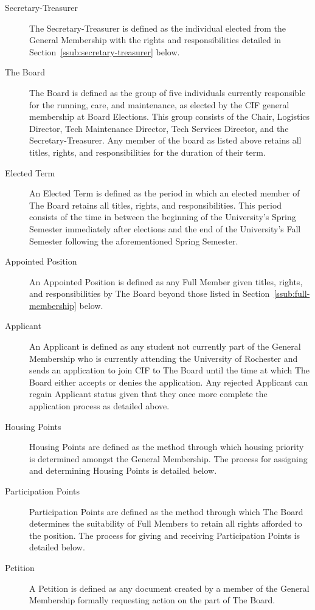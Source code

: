 \begin{description}
  \item[Secretary-Treasurer] The Secretary-Treasurer is defined as the individual elected from the General Membership with the rights and responsibilities detailed in Section~\ref{ssub:secretary-treasurer} below.

  \item[The Board] The Board is defined as the group of five individuals currently responsible for the running, care, and maintenance, as elected by the CIF general membership at Board Elections. This group consists of the Chair, Logistics Director, Tech Maintenance Director, Tech Services Director, and the Secretary-Treasurer. Any member of the board as listed above retains all titles, rights, and responsibilities for the duration of their term.

  \item[Elected Term] An Elected Term is defined as the period in which an elected member of The Board retains all titles, rights, and responsibilities. This period consists of the time in between the beginning of the University's Spring Semester immediately after elections and the end of the University's Fall Semester following the aforementioned Spring Semester.

  \item[Appointed Position] An Appointed Position is defined as any Full Member given titles, rights, and responsibilities by The Board beyond those listed in Section~\ref{ssub:full-membership} below.

  \item[Applicant] An Applicant is defined as any student not currently part of the General Membership who is currently attending the University of Rochester and sends an application to join CIF to The Board until the time at which The Board either accepts or denies the application. Any rejected Applicant can regain Applicant status given that they once more complete the application process as detailed above.

  \item[Housing Points] Housing Points are defined as the method through which housing priority is determined amongst the General Membership. The process for assigning and determining Housing Points is detailed below.

  \item[Participation Points] Participation Points are defined as the method through which The Board determines the suitability of Full Members to retain all rights afforded to the position. The process for giving and receiving Participation Points is detailed below.

  \item[Petition] A Petition is defined as any document created by a member of the General Membership formally requesting action on the part of The Board.
\end{description}

